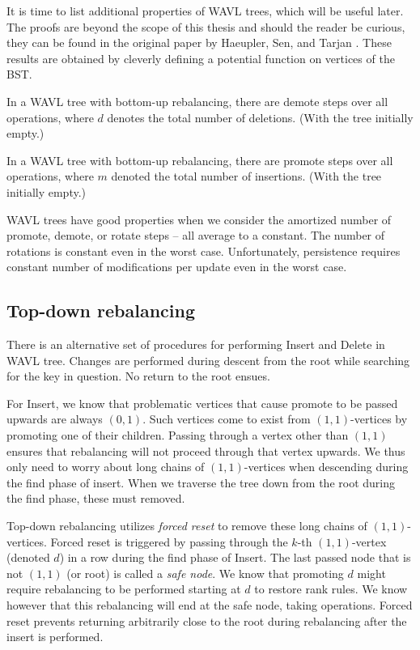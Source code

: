 It is time to list additional properties of WAVL trees, which will be useful later. The proofs are beyond the scope of this thesis and should the reader be curious, they can be found in the original paper by Haeupler, Sen, and Tarjan \cite{rank-balanced-trees}. These results are obtained by cleverly defining a potential function on vertices of the BST.

\begin{thm}
In a WAVL tree with bottom-up rebalancing, there are  demote steps over all operations, where $d$ denotes the total number of deletions. (With the tree initially empty.)
\end{thm}

\begin{thm}
In a WAVL tree with bottom-up rebalancing, there are  promote steps over all operations, where $m$ denoted the total number of insertions. (With the tree initially empty.)
\end{thm}

WAVL trees have good properties when we consider the amortized number of promote, demote, or rotate steps -- all average to a constant. The number of rotations is constant even in the worst case. Unfortunately, persistence requires constant number of modifications per update even in the worst case.

\subsection{Top-down rebalancing}

There is an alternative set of procedures for performing Insert and Delete in WAVL tree. Changes are performed during descent from the root while searching for the key in question. No return to the root ensues.

For Insert, we know that problematic vertices that cause promote to be passed upwards are always $(0,1)$. Such vertices come to exist from $(1,1)$-vertices by promoting one of their children. Passing through a vertex other than $(1,1)$ ensures that rebalancing will not proceed through that vertex upwards. We thus only need to worry about long chains of $(1,1)$-vertices when descending during the find phase of insert. When we traverse the tree down from the root during the find phase, these must removed.

Top-down rebalancing utilizes \emph{forced reset} to remove these long chains of $(1,1)$-vertices. Forced reset is triggered by passing through the $k$-th $(1,1)$-vertex (denoted $d$) in a row during the find phase of Insert. The last passed node that is not $(1,1)$ (or root) is called a \textit{safe node}. We know that promoting $d$ might require rebalancing to be performed starting at $d$ to restore rank rules. We know however that this rebalancing will end at the safe node, taking  operations.
Forced reset prevents returning arbitrarily close to the root during rebalancing after the insert is performed.

